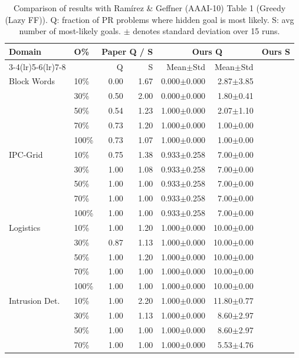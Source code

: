 \begin{table}[t]
\centering
\caption{Comparison of results with Ramírez \& Geffner (AAAI-10) Table 1 (Greedy (Lazy FF)). Q: fraction of PR problems where hidden goal is most likely. S: avg number of most-likely goals. $\pm$ denotes standard deviation over 15 runs.}
\label{tab:results_greedy}
\small
\begin{tabular}{llrrrrrr}
\toprule
Domain & O\% & \multicolumn{2}{c}{Paper Q / S} & \multicolumn{2}{c}{Ours Q} & \multicolumn{2}{c}{Ours S} \\
\cmidrule(lr){3-4}\cmidrule(lr){5-6}\cmidrule(lr){7-8}
 & & Q & S & Mean$\pm$Std & Mean$\pm$Std \\
\midrule
Block Words & 10\% & 0.00 & 1.67 & 0.000$\pm$0.000 & 2.87$\pm$3.85 \\
 & 30\% & 0.50 & 2.00 & 0.000$\pm$0.000 & 1.80$\pm$0.41 \\
 & 50\% & 0.54 & 1.23 & 1.000$\pm$0.000 & 2.07$\pm$1.10 \\
 & 70\% & 0.73 & 1.20 & 1.000$\pm$0.000 & 1.00$\pm$0.00 \\
 & 100\% & 0.73 & 1.07 & 1.000$\pm$0.000 & 1.00$\pm$0.00 \\
\midrule
IPC-Grid & 10\% & 0.75 & 1.38 & 0.933$\pm$0.258 & 7.00$\pm$0.00 \\
 & 30\% & 1.00 & 1.08 & 0.933$\pm$0.258 & 7.00$\pm$0.00 \\
 & 50\% & 1.00 & 1.00 & 0.933$\pm$0.258 & 7.00$\pm$0.00 \\
 & 70\% & 1.00 & 1.00 & 0.933$\pm$0.258 & 7.00$\pm$0.00 \\
 & 100\% & 1.00 & 1.00 & 0.933$\pm$0.258 & 7.00$\pm$0.00 \\
\midrule
Logistics & 10\% & 1.00 & 1.20 & 1.000$\pm$0.000 & 10.00$\pm$0.00 \\
 & 30\% & 0.87 & 1.13 & 1.000$\pm$0.000 & 10.00$\pm$0.00 \\
 & 50\% & 1.00 & 1.20 & 1.000$\pm$0.000 & 10.00$\pm$0.00 \\
 & 70\% & 1.00 & 1.00 & 1.000$\pm$0.000 & 10.00$\pm$0.00 \\
 & 100\% & 1.00 & 1.00 & 1.000$\pm$0.000 & 10.00$\pm$0.00 \\
\midrule
Intrusion Det. & 10\% & 1.00 & 2.20 & 1.000$\pm$0.000 & 11.80$\pm$0.77 \\
 & 30\% & 1.00 & 1.13 & 1.000$\pm$0.000 & 8.60$\pm$2.97 \\
 & 50\% & 1.00 & 1.00 & 1.000$\pm$0.000 & 8.60$\pm$2.97 \\
 & 70\% & 1.00 & 1.00 & 1.000$\pm$0.000 & 5.53$\pm$4.76 \\

\end{tabular}
\end{table}
